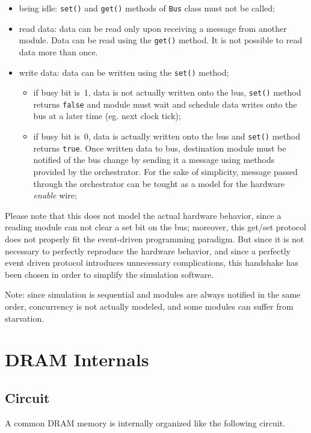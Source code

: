 \documentclass[a4paper,12pt]{article}
\begin{document}
\begin{itemize}
  \item being idle: \texttt{set()} and \texttt{get()} methods of \texttt{Bus} class must not be called;
  \item read data: data can be read only upon receiving a message from another module. Data can be read using the \texttt{get()} method. It is not possible to read data more than once.
  \item write data: data can be written using the \texttt{set()} method;
  \begin{itemize}
    \item if busy bit is~1, data is not actually written onto the bus, \texttt{set()} method returns \texttt{false} and module must wait and schedule data writes onto the bus at a later time (eg. next clock tick);
    \item if busy bit is~0, data is actually written onto the bus and \texttt{set()} method returns \texttt{true}.
    Once written data to bus, destination module must be notified of the bus change by sending it a message using methods provided by the orchestrator.
    For the sake of simplicity, message passed through the orchestrator can be tought as a model for the hardware \emph{enable} wire;
  \end{itemize}
\end{itemize}

Please note that this does not model the actual hardware behavior, since a reading module can not clear a set bit on the bus;
moreover, this get/set protocol does not properly fit the event-driven programming paradigm.
But since it is not necessary to perfectly reproduce the hardware behavior, and since a perfectly event driven protocol introduces unnecessary complications, this handshake has been chosen in order to simplify the simulation software.

Note: since simulation is sequential and modules are always notified in the same order, concurrency is not actually modeled, and some modules can suffer from starvation.

\section{DRAM Internals}
\subsection{Circuit}
A common DRAM memory is internally organized like the following circuit.
\end{document}
